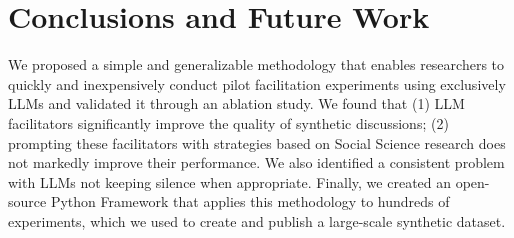 %
\section{Conclusions and Future Work}

We proposed a simple and generalizable methodology that enables researchers to quickly and inexpensively conduct pilot facilitation experiments using exclusively LLMs and validated it through an ablation study. We found that (1) LLM facilitators significantly improve the quality of synthetic discussions; (2) prompting these facilitators with strategies based on Social Science research does not markedly improve their performance. We also identified a consistent problem with LLMs not keeping silence when appropriate. Finally, we created an open-source Python Framework that applies this methodology to hundreds of experiments, which we used to create and publish a large-scale synthetic dataset.